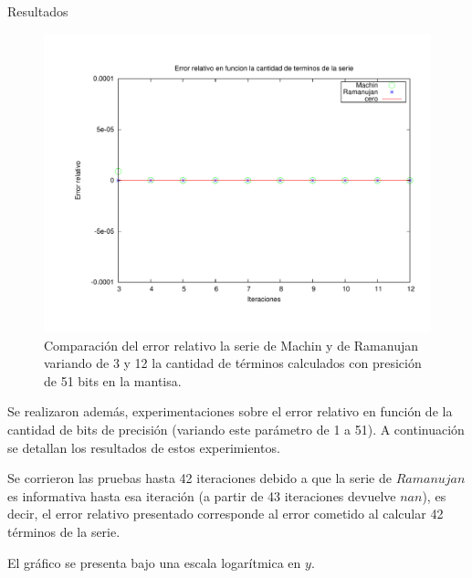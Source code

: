 \begin{section}{Resultados}
	\begin{figure}[H]
	  \centering
		\includegraphics[width=14cm]{graficos/comparacion_machin-ram.pdf}
	  \caption{Comparación del error relativo la serie de Machin y de Ramanujan variando de 3 y 12 la cantidad de términos calculados con presición de 51 bits en la mantisa.}
	  \label{fig:greg-ram}
	\end{figure}
	
	Se realizaron además, experimentaciones sobre el error relativo en función de la cantidad de bits de precisión (variando este parámetro de 1 a 51). A continuación se detallan los resultados de estos experimientos.
	
	Se corrieron las pruebas hasta 42 iteraciones debido a que la serie de $Ramanujan$ es informativa hasta esa iteración (a partir de 43 iteraciones devuelve $nan$), es decir, el error relativo presentado corresponde al error cometido al calcular 42 términos de la serie.
	
	El gráfico se presenta bajo una escala logarítmica en $y$.
	

\end{section}
